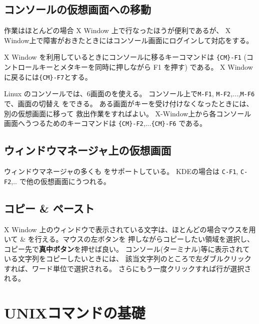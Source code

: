\documentclass{jreport}
\begin{document}
\section{コンソールの仮想画面への移動}

作業はほとんどの場合 X Window 上で行なったほうが便利であるが、
X Window上で障害がおきたときにはコンソール画面にログインして対応をする。

X Window を利用しているときにコンソールに移るキーコマンドは
\verb|{CM}-F1| (コントロールキーとメタキーを同時に押しながら F1 を押す)
である。
X Window に戻るには\verb|{CM}-F7|とする。

Linux のコンソールでは、6画面のを使える。
コンソール上で\verb|M-F1|, \verb|M-F2|,...,\verb|M-F6|で、画面の切替え
をできる。
ある画面がキーを受け付けなくなったときには、別の仮想画面に移って
救出作業をすればよい。
X-Window上から各コンソール画面へうつるためのキーコマンドは
\verb|{CM}-F2|,...\verb|{CM}-F6| である。


\section{ウィンドウマネージャ上の仮想画面}

ウィンドウマネージャの多くも
をサポートしている。
KDEの場合は \verb|C-F1|, \verb|C-F2|,.. で他の仮想画面にうつれる。


\section{コピー \& ペースト}
X Window 上のウィンドウで表示されている文字は、ほとんどの場合マウスを用
いて \& を行える。マウスの左ボタンを
押しながらコピーしたい領域を選択し、コピー先で\textbf{真中ボタン}を押せば良い。
コンソール(ターミナル)等に表示されている文字列をコピーしたいときには、
該当文字列のところで左ダブルクリックすれば、ワード単位で選択される。
さらにもう一度クリックすれば行が選択される。

\chapter{UNIXコマンドの基礎}
\end{document}
